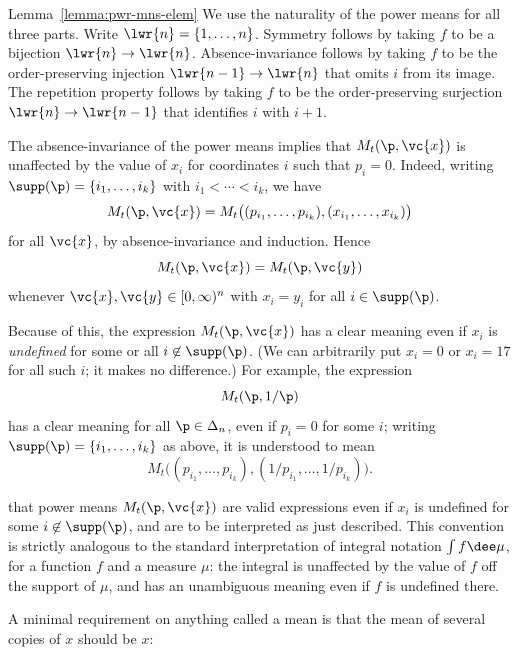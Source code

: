 \begin{pfof}{Lemma~\ref{lemma:pwr-mns-elem}}
We use the naturality of the power means
for all three parts.  Write $\lwr{n} = \{1, \ldots, n\}$.  Symmetry follows
by taking $f$ to be a bijection $\lwr{n} \to \lwr{n}$.
Absence-invariance follows by taking $f$ to be the order-preserving
injection $\lwr{n - 1} \to \lwr{n}$ that omits $i$ from its image.  The
repetition property follows by taking $f$ to be the order-preserving
surjection $\lwr{n} \to \lwr{n - 1}$ that identifies $i$ with $i + 1$.
\end{pfof}

\begin{remark}
The absence-invariance of the power means implies that $M_t(\p, \vc{x})$
is unaffected by the value of $x_i$ for coordinates $i$ such that $p_i =
0$.  Indeed, writing $\supp(\p) = \{i_1, \ldots, i_k\}$ with $i_1 < \cdots
< i_k$, we have
\[
M_t(\p, \vc{x})
=
M_t\bigl( (p_{i_1}, \ldots, p_{i_k}), (x_{i_1}, \ldots, x_{i_k})\bigr)
\]
for all $\vc{x}$, by absence-invariance and induction.  Hence
\[
M_t(\p, \vc{x}) = M_t(\p, \vc{y})
\]
whenever $\vc{x}, \vc{y} \in [0, \infty)^n$ with $x_i = y_i$ for all $i \in
\supp(\p)$.

Because of this, the expression $M_t(\p, \vc{x})$ has a clear meaning even
if $x_i$ is \emph{undefined} for some or all $i \not\in \supp(\p)$.  (We
can arbitrarily put $x_i = 0$ or $x_i = 17$ for all such $i$;
it makes no difference.)  For example, the expression
\[
M_t(\p, 1/\p)
\]
has a clear meaning for all $\p \in \Delta_n$, even if $p_i = 0$ for some
$i$; writing $\supp(\p) = \{i_1, \ldots, i_k\}$ as above, it is understood
to mean
\[
M_t\bigl( (p_{i_1}, \ldots, p_{i_k}), (1/p_{i_1}, \ldots, 1/p_{i_k})\bigr).
\]

 that power means
$M_t(\p, \vc{x})$ are valid expressions even if $x_i$ is undefined for some
$i \not\in \supp(\p)$, and are to be interpreted as just described.  This
convention is strictly analogous to the standard interpretation of integral
notation $\int f \dee\mu$, for a function $f$ and a measure $\mu$: the
integral is unaffected by the value of $f$ off the support of $\mu$, and
has an unambiguous meaning even if $f$ is undefined there.
\end{remark}

A minimal requirement on anything called a mean is that the mean of
several copies of $x$ should be $x$:

